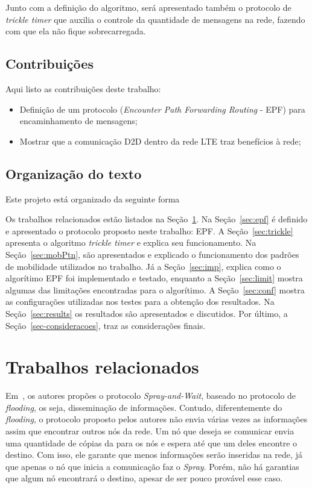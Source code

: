 \documentclass[11pt,a4paper,titlepage]{article}
\begin{document}
Junto com a definição do algoritmo, será apresentado também o protocolo de \textit{trickle timer} que auxilia o controle da quantidade de mensagens na rede, fazendo com que ela não fique sobrecarregada.

\subsection{Contribuições}

Aqui listo as contribuições deste trabalho:

\begin{itemize}
\item Definição de um protocolo (\textit{Encounter Path Forwarding Routing} - EPF) para encaminhamento de mensagens;
\item Mostrar que a comunicação D2D dentro da rede LTE traz benefícios à rede;
\end{itemize}

\subsection{Organização do texto}
Este projeto está organizado da seguinte forma

Os trabalhos relacionados estão listados na Seção~\ref{sec:trabRel}.
Na Seção~\ref{sec:epf} é definido e apresentado o protocolo proposto neste trabalho: EPF.
A Seção~\ref{sec:trickle} apresenta o algoritmo \textit{trickle timer} e explica seu funcionamento.
Na Seção~\ref{sec:mobPtn}, são apresentados e explicado o funcionamento dos padrões de mobilidade utilizados no trabalho.
Já a Seção~\ref{sec:imp}, explica como o algorítimo EPF foi implementado e testado, enquanto a Seção~\ref{sec:limit} mostra algumas das limitações encontradas para o algorítimo.
A Seção~\ref{sec:conf} mostra as configurações utilizadas nos testes para a obtenção dos resultados.
Na Seção~\ref{sec:results} os resultados são apresentados e discutidos.
Por último, a Seção~\ref{sec-consideracoes}, traz as considerações finais.

\section{Trabalhos relacionados}\label{sec:trabRel}

Em~\cite{Spyropoulos}, os autores propões o protocolo \textit{Spray-and-Wait}, baseado no protocolo de \textit{flooding}, os seja, disseminação de informações.
Contudo, diferentemente do \textit{flooding}, o protocolo proposto pelos autores não envia várias vezes as informações assim que encontrar outros nós da rede.
Um nó que deseja se comunicar envia uma quantidade de cópias da para os nós e espera até que um deles encontre o destino.
Com isso, ele garante que menos informações serão inseridas na rede, já que apenas o nó que inicia a comunicação faz o \textit{Spray}.
Porém, não há garantias que algum nó encontrará o destino, apesar de ser pouco provável esse caso.
\end{document}

